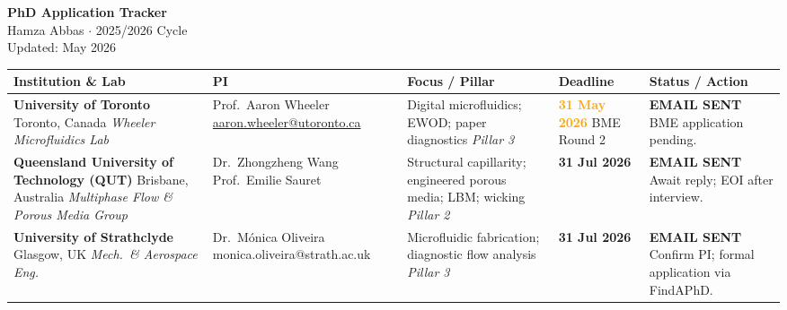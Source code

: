 \documentclass[11pt,a4paper]{article}
\begin{document}

\begin{center}
  {\LARGE\bfseries\color{accent} PhD Application Tracker}\\[4pt]
  {\large Hamza Abbas $\cdot$ 2025/2026 Cycle}\\[2pt]
  \small Updated: May 2026
\end{center}

\vspace{8pt}
\small
\renewcommand{\arraystretch}{1.65}

\begin{longtable}{@{} p{3.6cm} p{3.0cm} p{2.8cm} p{1.9cm} p{3.2cm} @{}}
\toprule
\textbf{Institution \& Lab} & \textbf{PI} & \textbf{Focus / Pillar}
  & \textbf{Deadline} & \textbf{Status / Action} \\
\midrule
\endhead

\textbf{University of Toronto}
\newline Toronto, Canada
\newline \textit{Wheeler Microfluidics Lab}
&
Prof.\ Aaron Wheeler \newline
\href{mailto:aaron.wheeler@utoronto.ca}{\footnotesize aaron.wheeler@utoronto.ca}
&
Digital microfluidics; EWOD; paper diagnostics
\newline \textit{Pillar 3}
&
\textcolor{orange}{\textbf{31 May 2026}} \newline
{\tiny BME Round 2}
&
\textcolor{done}{\textbf{EMAIL SENT}} \newline
BME application pending. \\

\midrule

\textbf{Queensland University of Technology (QUT)}
\newline Brisbane, Australia
\newline \textit{Multiphase Flow \& Porous Media Group}
&
Dr.\ Zhongzheng Wang \newline
Prof.\ Emilie Sauret
&
Structural capillarity; engineered porous media; LBM; wicking
\newline \textit{Pillar 2}
&
\textcolor{accent}{\textbf{31 Jul 2026}}
&
\textcolor{done}{\textbf{EMAIL SENT}} \newline
Await reply; EOI after interview. \\

\midrule

\textbf{University of Strathclyde}
\newline Glasgow, UK
\newline \textit{Mech.\ \& Aerospace Eng.}
&
Dr.\ M\'{o}nica Oliveira \newline
{\footnotesize monica.oliveira@strath.ac.uk}
&
Microfluidic fabrication; diagnostic flow analysis
\newline \textit{Pillar 3}
&
\textcolor{accent}{\textbf{31 Jul 2026}}
&
\textcolor{done}{\textbf{EMAIL SENT}} \newline
Confirm PI; formal application via FindAPhD. \\


\end{longtable}
\end{document}
